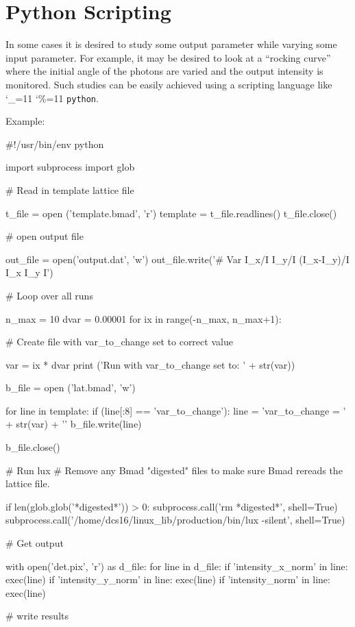 \documentclass[11pt]{article}
\newcommand\ttcmd{\begingroup\catcode`\_=11 \catcode`\%=11 \dottcmd}
\newcommand\dottcmd[1]{\texttt{#1}\endgroup}
\newcommand{\vn}{\ttcmd}
\begin{document}
{{{{{{{{{{{\section{Python Scripting}
\label{s:python}

In some cases it is desired to study some output parameter while
varying some input parameter. For example, it may be desired to look
at a ``rocking curve'' where the initial angle of the photons are
varied and the output intensity is monitored.  Such studies can be
easily achieved using a scripting language like \vn{python}.

Example:
\begin{listing}{1}
#!/usr/bin/env python

import subprocess
import glob

# Read in template lattice file

t_file = open ('template.bmad', 'r')
template = t_file.readlines()
t_file.close()

# open output file

out_file = open('output.dat', 'w')
out_file.write('#       Var         I_x/I         I_y/I   (I_x-I_y)/I           I_x           I_y             I\n')

# Loop over all runs

n_max = 10
dvar = 0.00001
for ix in range(-n_max, n_max+1):

  # Create file with var_to_change set to correct value

  var = ix * dvar
  print ('Run with var_to_change set to: ' + str(var))

  b_file = open ('lat.bmad', 'w')

  for line in template:
    if (line[:8] == 'var_to_change'): line = 'var_to_change = ' + str(var) + '\n'
    b_file.write(line)

  b_file.close()

  # Run lux
  # Remove any Bmad "digested" files to make sure Bmad rereads the lattice file.

  if len(glob.glob('*digested*')) > 0: subprocess.call('rm *digested*', shell=True)
  subprocess.call('/home/dcs16/linux_lib/production/bin/lux -silent', shell=True)

  # Get output

  with open('det.pix', 'r') as d_file:
    for line in d_file:
      if 'intensity_x_norm' in line: exec(line)
      if 'intensity_y_norm' in line: exec(line)
      if 'intensity_norm' in line: exec(line)

  # write results


\end{listing}}}}}}}}}}}}
\end{document}

